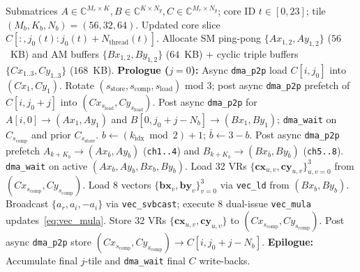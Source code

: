 \documentclass[journal]{IEEEtran}
\begin{document}
\begin{algorithm}[t]
\caption{Device-Side 14-Channel Tri-Buffered DSP Kernel}
\label{alg:device_kernel}
\footnotesize
\begin{algorithmic}[1]
\REQUIRE Submatrices $A \in \mathbb{C}^{M_r \times K}, B \in \mathbb{C}^{K \times N_g}, C \in \mathbb{C}^{M_r \times N_g}$; core ID $t \in [0, 23]$; tile $(M_b, K_b, N_b) = (56, 32, 64)$.
\ENSURE Updated core slice $C[:, j_0(t) : j_0(t)+N_{\mathrm{thread}}(t)]$.
\STATE Allocate SM ping-pong $\{Ax_{1,2}, Ay_{1,2}\}$ ($56$~KB) and AM buffers $\{Bx_{1,2}, By_{1,2}\}$ ($64$~KB) + cyclic triple buffers $\{Cx_{1..3}, Cy_{1..3}\}$ ($168$~KB).
    \STATE \textbf{Prologue ($j=0$):} Async \texttt{dma\_p2p} load $C[i, j_0]$ into $(Cx_1, Cy_1)$.
        \STATE Rotate $(s_{\mathrm{store}}, s_{\mathrm{comp}}, s_{\mathrm{load}})$ mod $3$; post async \texttt{dma\_p2p} prefetch of $C[i, j_0+j]$ into $(Cx_{s_{\mathrm{load}}}, Cy_{s_{\mathrm{load}}})$.
        \STATE Post async \texttt{dma\_p2p} for $A[i, 0] \to (Ax_1, Ay_1)$ and $B[0, j_0+j-N_b] \to (Bx_1, By_1)$; \texttt{dma\_wait} on $C_{s_{\mathrm{comp}}}$ and prior $C_{s_{\mathrm{store}}}$.
            \STATE $b \leftarrow (k_{\mathrm{idx}} \bmod 2) + 1$; $\bar{b} \leftarrow 3 - b$.
                \STATE Post async \texttt{dma\_p2p} prefetch $A_{k+K_b} \to (Ax_{\bar{b}}, Ay_{\bar{b}})$ (\texttt{ch1..4}) and $B_{k+K_b} \to (Bx_{\bar{b}}, By_{\bar{b}})$ (\texttt{ch5..8}).
            \ENDIF
            \STATE \texttt{dma\_wait} on active $(Ax_b, Ay_b, Bx_b, By_b)$.
                \STATE Load 32 VRs $\{\mathbf{cx}_{u,v}, \mathbf{cy}_{u,v}\}_{u,v=0}^{3}$ from $(Cx_{s_{\mathrm{comp}}}, Cy_{s_{\mathrm{comp}}})$.
                    \STATE Load $8$ vectors $\{\mathbf{bx}_v, \mathbf{by}_v\}_{v=0}^{3}$ via \texttt{vec\_ld} from $(Bx_b, By_b)$.
                        \STATE Broadcast $\{a_r, a_i, -a_i\}$ via \texttt{vec\_svbcast}; execute $8$ dual-issue \texttt{vec\_mula} updates~\eqref{eq:vec_mula}.
                    \ENDFOR
                \ENDFOR
                \STATE Store 32 VRs $\{\mathbf{cx}_{u,v}, \mathbf{cy}_{u,v}\}$ to $(Cx_{s_{\mathrm{comp}}}, Cy_{s_{\mathrm{comp}}})$.
            \ENDFOR
        \ENDFOR
        \STATE Post async \texttt{dma\_p2p} store $(Cx_{s_{\mathrm{comp}}}, Cy_{s_{\mathrm{comp}}}) \to C[i, j_0+j-N_b]$.
    \ENDFOR
    \STATE \textbf{Epilogue:} Accumulate final $j$-tile and \texttt{dma\_wait} final $C$ write-backs.
\ENDFOR
\end{algorithmic}
\end{algorithm}
\end{document}
